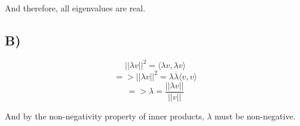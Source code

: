 \documentclass[12pt, letterpaper]{article}
\begin{document}
And therefore, all eigenvalues are real. 

\subsection*{B)}

\[ ||\lambda v||^2 = \langle \lambda v, \lambda v \rangle \]
\[ => ||\lambda v||^2 = \lambda \overline{\lambda} \langle v, v \rangle \]
\[ => \lambda = \frac{||\lambda v||}{||v||} \]

And by the non-negativity property of inner products, $\lambda$ must be non-negative. 
\end{document}
